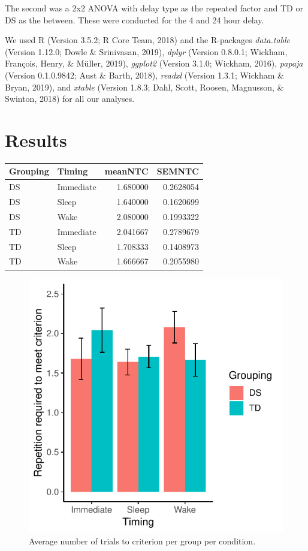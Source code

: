 \documentclass[man,floatsintext]{apa6}
\begin{document}
The second was a 2x2 ANOVA with delay type as the repeated factor and TD
or DS as the between. These were conducted for the 4 and 24 hour delay.

We used R (Version 3.5.2; R Core Team, 2018) and the R-packages
\emph{data.table} (Version 1.12.0; Dowle \& Srinivasan, 2019),
\emph{dplyr} (Version 0.8.0.1; Wickham, François, Henry, \& Müller,
2019), \emph{ggplot2} (Version 3.1.0; Wickham, 2016), \emph{papaja}
(Version 0.1.0.9842; Aust \& Barth, 2018), \emph{readxl} (Version 1.3.1;
Wickham \& Bryan, 2019), and \emph{xtable} (Version 1.8.3; Dahl, Scott,
Roosen, Magnusson, \& Swinton, 2018) for all our analyses.

\section{Results}\label{results}

\begin{tabular}{l|l|r|r}
\hline
Grouping & Timing & meanNTC & SEMNTC\\
\hline
DS & Immediate & 1.680000 & 0.2628054\\
\hline
DS & Sleep & 1.640000 & 0.1620699\\
\hline
DS & Wake & 2.080000 & 0.1993322\\
\hline
TD & Immediate & 2.041667 & 0.2789679\\
\hline
TD & Sleep & 1.708333 & 0.1408973\\
\hline
TD & Wake & 1.666667 & 0.2055980\\
\hline
\end{tabular}

\begin{figure}
\centering
\includegraphics{Midterm_in_papaja_files/figure-latex/NumberToCriterion-1.pdf}
\caption{\label{fig:NumberToCriterion}Average number of trials to criterion
per group per condition.}
\end{figure}
\end{document}
